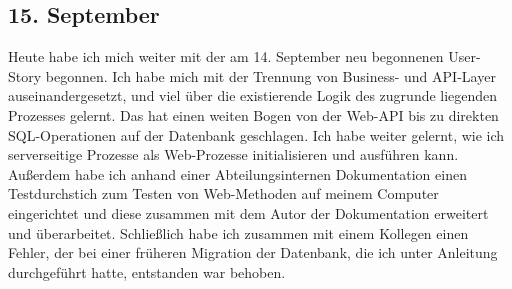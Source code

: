 \subsection{15. September}
Heute habe ich mich weiter mit der am 14. September neu begonnenen User-Story begonnen. Ich habe mich mit der Trennung von Business- und API-Layer auseinandergesetzt, und viel über die existierende Logik des zugrunde liegenden Prozesses gelernt. Das hat einen weiten Bogen von der Web-API bis zu direkten SQL-Operationen auf der Datenbank geschlagen. Ich habe weiter gelernt, wie ich serverseitige Prozesse als Web-Prozesse initialisieren und ausführen kann. Außerdem habe ich anhand einer Abteilungsinternen Dokumentation einen Testdurchstich zum Testen von Web-Methoden auf meinem Computer eingerichtet und diese zusammen mit dem Autor der Dokumentation erweitert und überarbeitet. Schließlich habe ich zusammen mit einem Kollegen einen Fehler, der bei einer früheren Migration der Datenbank, die ich unter Anleitung durchgeführt hatte, entstanden war behoben.
